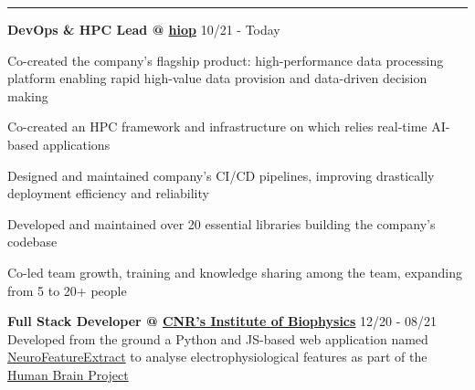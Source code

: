 \documentclass[11pt,letterpaper]{article}
\begin{document}
\begin{justify}
      \hrule
      \begin{itemize}[label={}, leftmargin=0pt]
            \begin{item}
                  \textbf{DevOps \& HPC Lead @ \href{https://hiop.io/}{hiop}}
                  \hfill
                  \small{10/21 - Today}
                  \vspace{-0.15cm}
                  \begin{itemize}[label={$\bullet$}, leftmargin=12.5pt, noitemsep]
                        \begin{item}
                              Co-created the company's flagship product: high-performance data processing platform enabling rapid high-value data provision and data-driven decision making
                        \end{item}
                        \begin{item}
                              Co-created an HPC framework and infrastructure on which relies real-time AI-based applications
                        \end{item}
                        \begin{item}
                              Designed and maintained company's CI/CD pipelines, improving drastically deployment efficiency and reliability
                        \end{item}
                        \begin{item}
                              Developed and maintained over 20 essential libraries building the company's codebase
                        \end{item}
                        \begin{item}
                              Co-led team growth, training and knowledge sharing among the team, expanding from 5 to 20+ people
                        \end{item}
                  \end{itemize}
            \end{item}
            \begin{item}
                  \textbf{Full Stack Developer @ \href{https://www.ibf.cnr.it}{CNR’s Institute of Biophysics}}
                  \hfill
                  \small{12/20 - 08/21}
                  \\
                  Developed from the ground a Python and JS-based web application named \href{https://hhnb.ebrains-italy.eu/efelg/}{NeuroFeatureExtract} to analyse electrophysiological features as part of the \href{https://www.humanbrainproject.eu/en/}{Human Brain Project}

\end{item}
\end{itemize}
\end{justify}
\end{document}

